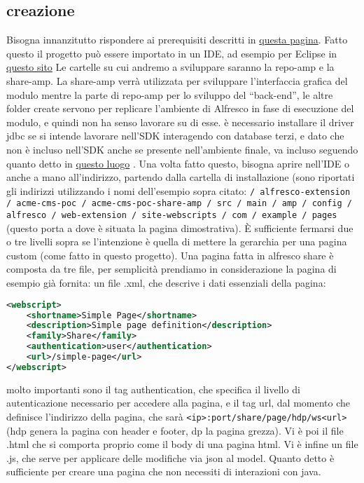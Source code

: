 \subsection{creazione}
Bisogna innanzitutto rispondere ai prerequisiti descritti in  \href{http://docs.alfresco.com/sdk2.1/concepts/alfresco-sdk-installing-prerequisite-software.html}{questa pagina}.
Fatto questo il progetto può essere importato in un IDE, ad esempio per Eclipse in \href{http://docs.alfresco.com/community/tasks/alfresco-sdk-rad-eclipse-import-projects.html}{questo sito}
Le cartelle su cui andremo a sviluppare saranno la repo-amp e la share-amp. La share-amp verrà utilizzata per sviluppare l’interfaccia grafica del modulo mentre la parte di repo-amp  per lo sviluppo del “back-end”, le altre folder create servono per replicare l’ambiente di Alfresco in fase di esecuzione del modulo, e quindi non ha senso lavorare su di esse.
è necessario installare il driver jdbc se si intende  lavorare nell’SDK interagendo con database terzi, e dato che non è incluso nell'SDK anche se presente nell'ambiente finale, va incluso seguendo quanto detto in  \href{https://community.alfresco.com/thread/213317-sdk-21-including-third-party-jar-libraries}{questo luogo} . 
Una volta fatto questo, bisogna aprire nell’IDE o anche a mano all’indirizzo, partendo dalla cartella di installazione (sono riportati gli indirizzi utilizzando i nomi dell’esempio sopra citato: \texttt{/ alfresco-extension / acme-cms-poc / acme-cms-poc-share-amp / src / main / amp / config / alfresco / web-extension / site-webscripts / com / example / pages}
 (questo porta a dove è situata la pagina dimostrativa). È sufficiente fermarsi due o tre livelli sopra se l’intenzione è quella di mettere la gerarchia per una pagina custom (come fatto in questo progetto).
Una pagina fatta in alfresco share è composta da tre file, per semplicità prendiamo in considerazione la pagina di esempio già fornita:
un file .xml, che descrive i dati essenziali della pagina:
\begin{lstlisting}[language=XML]
<webscript>
    <shortname>Simple Page</shortname>
    <description>Simple page definition</description>
    <family>Share</family>
    <authentication>user</authentication>
    <url>/simple-page</url>
</webscript>
\end{lstlisting}
molto importanti sono il tag authentication, che specifica il livello di autenticazione necessario per accedere alla pagina, e il tag url, dal momento che definisce l’indirizzo della pagina, che sarà \texttt{<ip>:port/share/page/hdp/ws<url>} (hdp genera la pagina con header e footer, dp la pagina grezza).
Vi è poi il file .html che si comporta proprio come il body di una pagina html.
Vi è infine un file .js, che serve per applicare delle modifiche via json al model.
Quanto detto è sufficiente per creare una pagina che non necessiti di interazioni con java.

